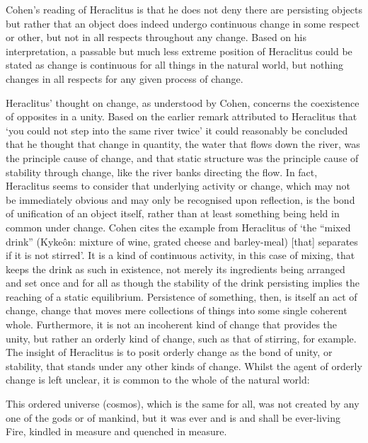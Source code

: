 Cohen's reading of Heraclitus is that he does not deny there are persisting objects but rather that an object does indeed undergo continuous change in some respect or other, but not in all respects throughout any change. \parencite[][]{cohen-heracli} Based on his interpretation, a passable but much less extreme position of Heraclitus could be stated as change is continuous for all things in the natural world, but nothing changes in all respects for any given process of change.

Heraclitus' thought on change, as understood by Cohen, concerns the coexistence of opposites in a unity. Based on the earlier remark attributed to Heraclitus that `you could not step into the same river twice' it could reasonably be concluded that he thought that change in quantity, the water that flows down the river, was the principle cause of change, and that static structure was the principle cause of stability through change, like the river banks directing the flow. In fact, Heraclitus seems to consider that underlying activity or change, which may not be immediately obvious and may only be recognised upon reflection, is the bond of unification of an object itself, rather than at least something being held in common under change.
Cohen cites the example from Heraclitus of `the ``mixed drink'' (Kyke\^on: mixture of wine, grated cheese and barley-meal) [that] separates if it is not stirred'. \parencite[][34]{fitt1983ancilla}
It is a kind of continuous activity, in this case of mixing, that keeps the drink as such in existence, not merely its ingredients being arranged and set once and for all as though the stability of the drink persisting implies the reaching of a static equilibrium. Persistence of something, then, is itself an act of change, change that moves mere collections of things into some single coherent whole. Furthermore, it is not an incoherent kind of change that provides the unity, but rather an orderly kind of change, such as that of stirring, for example. The insight of Heraclitus is to posit orderly change as the bond of unity, or stability, that stands under any other kinds of change. Whilst the agent of orderly change is left unclear, it is common to the whole of the natural world:
\begin{quoting}
This ordered universe (cosmos), which is the same for all, was not created by any one of the gods or of mankind, but it was ever and is and shall be ever-living Fire, kindled in measure and quenched in measure. \parencite[][27]{fitt1983ancilla}
\end{quoting}

